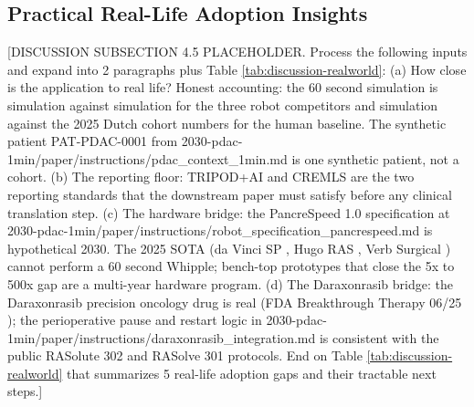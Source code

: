 \subsection{Practical Real-Life Adoption Insights}
\label{sec:discussion-realworld}

[DISCUSSION SUBSECTION 4.5 PLACEHOLDER. Process the following inputs and expand into 2 paragraphs plus Table \ref{tab:discussion-realworld}:
(a) How close is the application to real life? Honest accounting: the 60 second simulation is simulation against simulation for the three robot competitors and simulation against the 2025 Dutch cohort numbers \cite{DutchCohort2025Whipple} for the human baseline. The synthetic patient PAT-PDAC-0001 from 2030-pdac-1min/paper/instructions/pdac_context_1min.md is one synthetic patient, not a cohort.
(b) The reporting floor: TRIPOD+AI \cite{Collins2024TRIPODAI} and CREMLS \cite{ElEmam2024CREMLS} are the two reporting standards that the downstream paper must satisfy before any clinical translation step.
(c) The hardware bridge: the PancreSpeed 1.0 specification at 2030-pdac-1min/paper/instructions/robot_specification_pancrespeed.md is hypothetical 2030. The 2025 SOTA (da Vinci SP \cite{intuitive-davinci-sp}, Hugo RAS \cite{medtronic-hugo-ras}, Verb Surgical \cite{verb-surgical}) cannot perform a 60 second Whipple; bench-top prototypes that close the 5x to 500x gap are a multi-year hardware program.
(d) The Daraxonrasib bridge: the Daraxonrasib precision oncology drug is real (FDA Breakthrough Therapy 06/25 \cite{rev-fda-breakthrough}); the perioperative pause and restart logic in 2030-pdac-1min/paper/instructions/daraxonrasib_integration.md is consistent with the public RASolute 302 \cite{rasolute302} and RASolve 301 \cite{rasolve301} protocols.
End on Table \ref{tab:discussion-realworld} that summarizes 5 real-life adoption gaps and their tractable next steps.]

